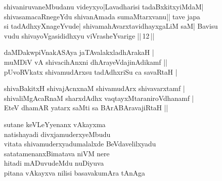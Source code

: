 \begin{entry}
\begin{shl}
shivaniruvaneMbudanu videyxyo|Lavadharisi tadaBxkitxyiMdaM|\\
shivasamacaRnegeYdu shivanAmada sumaMtarxvanu|| tave japa\\
si tadAdhxyXnageYvude| shivamahAvarxtavidhayxgaLiM saM| Bavisu\\
vudu shivayoVgasididhxyu viVrasheYvarige ||\,12\,||
\end{shl}
\end{entry}

\begin{entry}
\begin{shl}
daMDakwpiVnakASAya jaTAvalakxladhArakaH |\\
muMDiV vA shivacihAnxni dhArayeVdajinAdikamf ||\\
pUvoRVkatx shivamudArxsu tadAdhxriSu ca savaRtaH | 
\end{shl}
\begin{shl}
shivaBakitxH shivajAcnxnaM shivamudArx shivavarxtamf |\\
shivaliMgAcaRnaM sharxdAdhx vaqtayxMtaraniroVdhanamf |\\
EteV dhamAR yatarx saMti sa BArABAravajiRtaH ||
\end{shl}
\end{entry}

\begin{entry}
\gl{}
\begin{shl}
sutane keVLeYyenanx vAkayxma\\
natishayadi divxjamuderxyeMbudu\\
vitata shivamuderxyadumalalxde BeVdavelilxyadu\\
satatamenanxBimatava niVM nere\\
hitadi mADuvudeMdu nuDiyuva\\
pitana vAkayxva nilisi basavakumAra tAnAga
\end{shl}
\end{entry}

